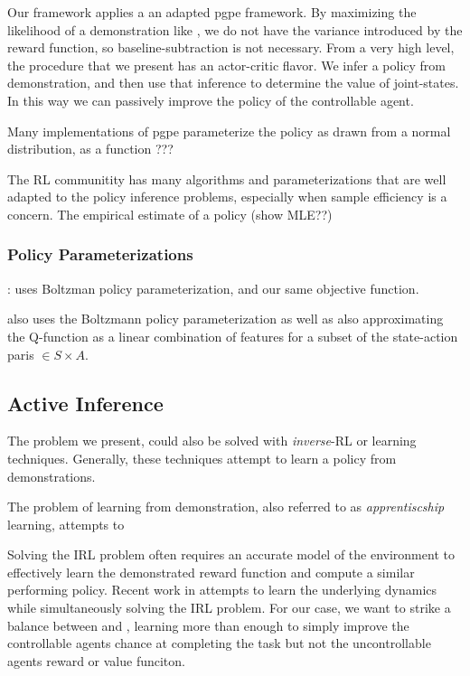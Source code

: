     Our framework applies a an adapted \ac{pgpe} framework. By maximizing the likelihood of a demonstration like
    \cite{herman2016inverse}, we do not have the variance introduced by the reward function, so baseline-subtraction is
    not necessary. From a very high level, the procedure that we present has an actor-critic flavor. We infer a policy
    from demonstration, and then use that inference to determine the value of joint-states. In this way we can passively
    improve the policy of the controllable agent.

    Many implementations of \ac{pgpe} parameterize the policy as drawn from a normal distribution, as a function ???



    The \ac{RL} communitity has many algorithms and parameterizations that are well adapted to the policy inference
    problems, especially when sample efficiency is a concern. The empirical estimate of a policy (show MLE??)



\subsubsection{Policy Parameterizations}
    \cite{herman2016inverse}: uses Boltzman policy parameterization, and our same objective function.

    \cite{Hanawal2017LearningPolicies} also uses the Boltzmann policy parameterization as well as also approximating
    the Q-function as a linear combination of features for a subset of the state-action paris $\in S \times A$.


\subsection{Active Inference}

    The problem we present, could also be solved with  \textit{inverse}-\ac{RL} or  learning techniques.
    Generally, these techniques attempt to learn a policy from  demonstrations.

    The problem of learning from demonstration, also referred to as \textit{apprentiscship} learning, attempts to

    Solving the IRL problem often requires an accurate model of the environment to effectively learn the demonstrated
    reward function and compute a similar performing policy. Recent work in \cite{herman2016inverse} attempts to learn
    the underlying dynamics while simultaneously solving the IRL problem. For our case, we want to strike a balance
    between \cite{bandyopadhyay2013intention} and \cite{herman2016inverse}, learning more than enough to simply improve
    the controllable agents chance at completing the task but not the uncontrollable agents reward or value funciton.

